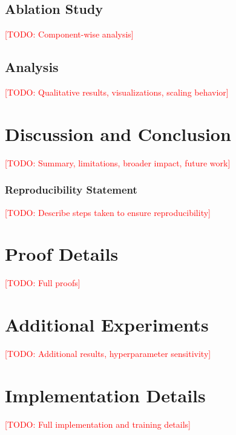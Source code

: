 \documentclass{article}
\newcommand{\todo}[1]{\textcolor{red}{[TODO: #1]}}
\begin{document}
\subsection{Ablation Study}
\label{sec:ablation}
\todo{Component-wise analysis}

\subsection{Analysis}
\label{sec:analysis}
\todo{Qualitative results, visualizations, scaling behavior}

\section{Discussion and Conclusion}
\label{sec:conclusion}

\todo{Summary, limitations, broader impact, future work}

\subsubsection*{Reproducibility Statement}
\todo{Describe steps taken to ensure reproducibility}





\appendix
\section{Proof Details}
\label{app:proofs}
\todo{Full proofs}

\section{Additional Experiments}
\label{app:experiments}
\todo{Additional results, hyperparameter sensitivity}

\section{Implementation Details}
\label{app:implementation}
\todo{Full implementation and training details}
\end{document}

